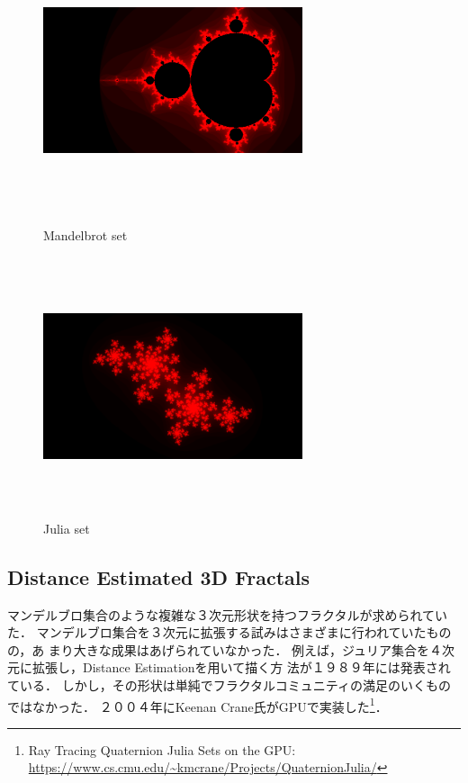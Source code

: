 \begin{figure}[htbp]
 \begin{minipage}{0.49\hsize}
  \begin{center}
   \includegraphics[width=3in, height=3in, keepaspectratio]{../img/fractal/mandelbrot.pdf}
   \caption{Mandelbrot set}
   \label{fig:mandelbrot}
  \end{center}
 \end{minipage}
 \begin{minipage}{0.49\hsize}
     \includegraphics[width=3in, height=3in, keepaspectratio]{../img/fractal/julia.pdf}
   \caption{Julia set}
   \label{fig:julia}
 \end{minipage}
\end{figure}

\subsection{Distance Estimated 3D Fractals}

マンデルブロ集合のような複雑な３次元形状を持つフラクタルが求められていた．
マンデルブロ集合を３次元に拡張する試みはさまざまに行われていたものの，あ
まり大きな成果はあげられていなかった．
例えば，ジュリア集合を４次元に拡張し，Distance Estimationを用いて描く方
法が１９８９年には発表されている\cite{4djulia}．
しかし，その形状は単純でフラクタルコミュニティの満足のいくものではなかった．
２００４年にKeenan Crane氏がGPUで実装した\footnote{Ray Tracing
Quaternion Julia Sets on the GPU:
\url{https://www.cs.cmu.edu/~kmcrane/Projects/QuaternionJulia/}}．

